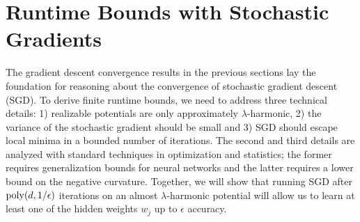 
\section{Runtime Bounds with Stochastic Gradients}

The gradient descent convergence results in the previous sections lay
the foundation for reasoning about the convergence of stochastic
gradient descent (SGD). To derive finite runtime bounds, we need to
address three technical details: 1) realizable potentials are only
approximately $\lambda$-harmonic, 2) the variance of the stochastic
gradient should be small and 3) SGD should escape local minima in a
bounded number of iterations. The second and third details are analyzed
with standard techniques in optimization and statistics; the former
requires generalization bounds for neural networks and the latter
requires a lower bound on the negative curvature. Together, we will
show that running SGD after $\mathrm{poly}(d,1/\epsilon)$ iterations on an
almost $\lambda$-harmonic potential will allow us to learn at least
one of the hidden weights $w_j$ up to $\epsilon$ accuracy.

